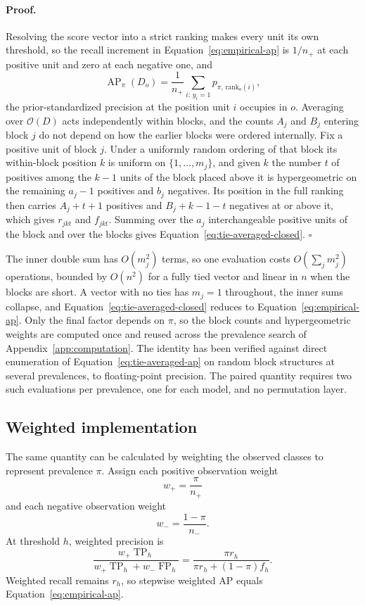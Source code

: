 \documentclass[11pt]{article}
\newcommand{\AP}{\operatorname{AP}}
\theoremstyle{remark}
\begin{document}
\paragraph{Proof.}
Resolving the score vector into a strict ranking makes every unit its own threshold, so the recall increment in Equation~\eqref{eq:empirical-ap} is $1/n_+$ at each positive unit and zero at each negative one, and
\[
\AP_\pi(D_o)
=
\frac{1}{n_+}
\sum_{i:\,y_i=1}
p_{\pi,\,\mathrm{rank}_o(i)} ,
\]
the prior-standardized precision at the position unit $i$ occupies in $o$. Averaging over $\mathcal{O}(D)$ acts independently within blocks, and the counts $A_j$ and $B_j$ entering block $j$ do not depend on how the earlier blocks were ordered internally. Fix a positive unit of block $j$. Under a uniformly random ordering of that block its within-block position $k$ is uniform on $\{1,\ldots,m_j\}$, and given $k$ the number $t$ of positives among the $k-1$ units of the block placed above it is hypergeometric on the remaining $a_j-1$ positives and $b_j$ negatives. Its position in the full ranking then carries $A_j+t+1$ positives and $B_j+k-1-t$ negatives at or above it, which gives $r_{jkt}$ and $f_{jkt}$. Summing over the $a_j$ interchangeable positive units of the block and over the blocks gives Equation~\eqref{eq:tie-averaged-closed}. $\square$

The inner double sum has $O(m_j^2)$ terms, so one evaluation costs $O(\sum_j m_j^2)$ operations, bounded by $O(n^2)$ for a fully tied vector and linear in $n$ when the blocks are short. A vector with no ties has $m_j=1$ throughout, the inner sums collapse, and Equation~\eqref{eq:tie-averaged-closed} reduces to Equation~\eqref{eq:empirical-ap}. Only the final factor depends on $\pi$, so the block counts and hypergeometric weights are computed once and reused across the prevalence search of Appendix~\ref{app:computation}. The identity has been verified against direct enumeration of Equation~\eqref{eq:tie-averaged-ap} on random block structures at several prevalences, to floating-point precision. The paired quantity requires two such evaluations per prevalence, one for each model, and no permutation layer.

\subsection{Weighted implementation}

The same quantity can be calculated by weighting the observed classes to represent prevalence $\pi$. Assign each positive observation weight
\[
w_+=\frac{\pi}{n_+}
\]
and each negative observation weight
\[
w_-=\frac{1-\pi}{n_-}.
\]
At threshold $h$, weighted precision is
\[
\frac{w_+\operatorname{TP}_h}
{w_+\operatorname{TP}_h+w_-\operatorname{FP}_h}
=
\frac{\pi r_h}
{\pi r_h+(1-\pi)f_h}.
\]
Weighted recall remains $r_h$, so stepwise weighted AP equals Equation~\eqref{eq:empirical-ap}.
\end{document}
